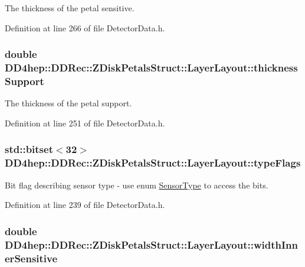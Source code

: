 The thickness of the petal sensitive. 

Definition at line 266 of file DetectorData.h.\hypertarget{struct_d_d4hep_1_1_d_d_rec_1_1_z_disk_petals_struct_1_1_layer_layout_a49467ec112b66d8cf7be0276d2c0db9d}{
\subsubsection[{thicknessSupport}]{\setlength{\rightskip}{0pt plus 5cm}double {\bf DD4hep::DDRec::ZDiskPetalsStruct::LayerLayout::thicknessSupport}}}
\label{struct_d_d4hep_1_1_d_d_rec_1_1_z_disk_petals_struct_1_1_layer_layout_a49467ec112b66d8cf7be0276d2c0db9d}


The thickness of the petal support. 

Definition at line 251 of file DetectorData.h.\hypertarget{struct_d_d4hep_1_1_d_d_rec_1_1_z_disk_petals_struct_1_1_layer_layout_a20e5c894370d93b960dccbb7b31d167c}{
\subsubsection[{typeFlags}]{\setlength{\rightskip}{0pt plus 5cm}std::bitset$<$32$>$ {\bf DD4hep::DDRec::ZDiskPetalsStruct::LayerLayout::typeFlags}}}
\label{struct_d_d4hep_1_1_d_d_rec_1_1_z_disk_petals_struct_1_1_layer_layout_a20e5c894370d93b960dccbb7b31d167c}


Bit flag describing sensor type -\/ use enum \hyperlink{struct_d_d4hep_1_1_d_d_rec_1_1_z_disk_petals_struct_1_1_sensor_type}{SensorType} to access the bits. 

Definition at line 239 of file DetectorData.h.\hypertarget{struct_d_d4hep_1_1_d_d_rec_1_1_z_disk_petals_struct_1_1_layer_layout_a662855ee8d2089bb1d109fc51e9307f1}{
\subsubsection[{widthInnerSensitive}]{\setlength{\rightskip}{0pt plus 5cm}double {\bf DD4hep::DDRec::ZDiskPetalsStruct::LayerLayout::widthInnerSensitive}}}
\label{struct_d_d4hep_1_1_d_d_rec_1_1_z_disk_petals_struct_1_1_layer_layout_a662855ee8d2089bb1d109fc51e9307f1}


